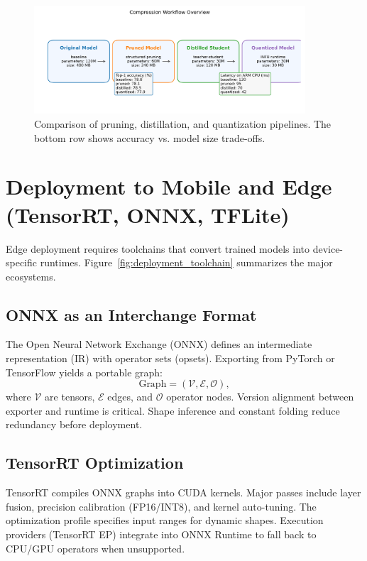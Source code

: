 \documentclass{article}
\begin{document}
\begin{figure}[H]
  \centering
  \includegraphics[width=0.9\textwidth]{compression_overview.png}
  \caption{Comparison of pruning, distillation, and quantization pipelines. The bottom row shows accuracy vs. model size trade-offs.}
  \label{fig:compression_overview}
\end{figure}
\FloatBarrier

\section{Deployment to Mobile and Edge (TensorRT, ONNX, TFLite)}
Edge deployment requires toolchains that convert trained models into device-specific runtimes. Figure~\ref{fig:deployment_toolchain} summarizes the major ecosystems.

\subsection{ONNX as an Interchange Format}
The Open Neural Network Exchange (ONNX) defines an intermediate representation (IR) with operator sets (opsets). Exporting from PyTorch or TensorFlow yields a portable graph:
\begin{equation}
  \text{Graph} = (\mathcal{V}, \mathcal{E}, \mathcal{O}),
\end{equation}
where $\mathcal{V}$ are tensors, $\mathcal{E}$ edges, and $\mathcal{O}$ operator nodes. Version alignment between exporter and runtime is critical. Shape inference and constant folding reduce redundancy before deployment.

\subsection{TensorRT Optimization}
TensorRT compiles ONNX graphs into CUDA kernels. Major passes include layer fusion, precision calibration (FP16/INT8), and kernel auto-tuning. The optimization profile specifies input ranges for dynamic shapes. Execution providers (TensorRT EP) integrate into ONNX Runtime to fall back to CPU/GPU operators when unsupported.
\end{document}
